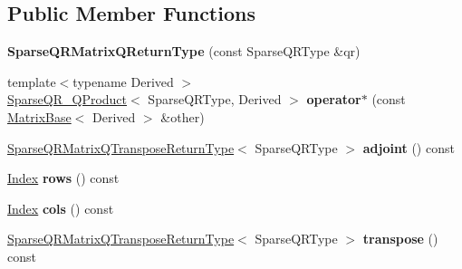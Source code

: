 \subsection*{Public Member Functions}
\begin{DoxyCompactItemize}
\item 
\mbox{\label{struct_eigen_1_1_sparse_q_r_matrix_q_return_type_abc812ddc00be7a2064aebaf2391b38db}} 
{\bfseries Sparse\+Q\+R\+Matrix\+Q\+Return\+Type} (const Sparse\+Q\+R\+Type \&qr)
\item 
\mbox{\label{struct_eigen_1_1_sparse_q_r_matrix_q_return_type_a3f62d406e5a92ac8d8d34a69f29d3b94}} 
{\footnotesize template$<$typename Derived $>$ }\\\hyperlink{struct_eigen_1_1_sparse_q_r___q_product}{Sparse\+Q\+R\+\_\+\+Q\+Product}$<$ Sparse\+Q\+R\+Type, Derived $>$ {\bfseries operator$\ast$} (const \hyperlink{group___core___module_class_eigen_1_1_matrix_base}{Matrix\+Base}$<$ Derived $>$ \&other)
\item 
\mbox{\label{struct_eigen_1_1_sparse_q_r_matrix_q_return_type_a0902d548d7f36fea171283e6fa865d9d}} 
\hyperlink{struct_eigen_1_1_sparse_q_r_matrix_q_transpose_return_type}{Sparse\+Q\+R\+Matrix\+Q\+Transpose\+Return\+Type}$<$ Sparse\+Q\+R\+Type $>$ {\bfseries adjoint} () const
\item 
\mbox{\label{struct_eigen_1_1_sparse_q_r_matrix_q_return_type_a93c8c61654bf112f42db9c61969b94eb}} 
\hyperlink{group___core___module_a554f30542cc2316add4b1ea0a492ff02}{Index} {\bfseries rows} () const
\item 
\mbox{\label{struct_eigen_1_1_sparse_q_r_matrix_q_return_type_add2a611eb8ecf1927f6ca326d86801e0}} 
\hyperlink{group___core___module_a554f30542cc2316add4b1ea0a492ff02}{Index} {\bfseries cols} () const
\item 
\mbox{\label{struct_eigen_1_1_sparse_q_r_matrix_q_return_type_a852f381b6742ef40f5168b54f8b95c1c}} 
\hyperlink{struct_eigen_1_1_sparse_q_r_matrix_q_transpose_return_type}{Sparse\+Q\+R\+Matrix\+Q\+Transpose\+Return\+Type}$<$ Sparse\+Q\+R\+Type $>$ {\bfseries transpose} () const

\end{DoxyCompactItemize}
